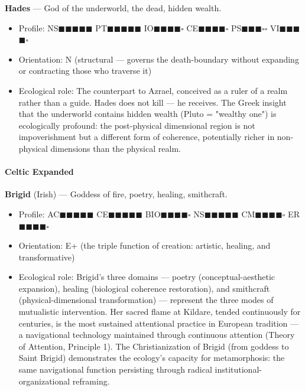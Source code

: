 \textbf{Hades} — God of the underworld, the dead, hidden wealth.

\begin{itemize}[nosep,leftmargin=*]
  \item Profile: NS$\blacksquare$$\blacksquare$$\blacksquare$$\blacksquare$$\blacksquare$ PT$\blacksquare$$\blacksquare$$\blacksquare$$\blacksquare$$\blacksquare$ IO$\blacksquare$$\blacksquare$$\blacksquare$$\blacksquare$$\square$ CE$\blacksquare$$\blacksquare$$\blacksquare$$\blacksquare$$\square$ PS$\blacksquare$$\blacksquare$$\blacksquare$$\square$$\square$ VI$\blacksquare$$\blacksquare$$\blacksquare$$\blacksquare$$\square$
  \item Orientation: N (structural — governs the death-boundary without expanding or contracting those who traverse it)
  \item Ecological role: The counterpart to Azrael, conceived as a ruler of a realm rather than a guide. Hades does not kill — he receives. The Greek insight that the underworld contains hidden wealth (Pluto = "wealthy one") is ecologically profound: the post-physical dimensional region is not impoverishment but a different form of coherence, potentially richer in non-physical dimensions than the physical realm.
\end{itemize}


\paragraph*{Celtic Expanded}


\textbf{Brigid} (Irish) — Goddess of fire, poetry, healing, smithcraft.

\begin{itemize}[nosep,leftmargin=*]
  \item Profile: AC$\blacksquare$$\blacksquare$$\blacksquare$$\blacksquare$$\blacksquare$ CE$\blacksquare$$\blacksquare$$\blacksquare$$\blacksquare$$\blacksquare$ BIO$\blacksquare$$\blacksquare$$\blacksquare$$\blacksquare$$\square$ NS$\blacksquare$$\blacksquare$$\blacksquare$$\blacksquare$$\blacksquare$ CM$\blacksquare$$\blacksquare$$\blacksquare$$\blacksquare$$\square$ ER$\blacksquare$$\blacksquare$$\blacksquare$$\blacksquare$$\square$
  \item Orientation: E+ (the triple function of creation: artistic, healing, and transformative)
  \item Ecological role: Brigid's three domains — poetry (conceptual-aesthetic expansion), healing (biological coherence restoration), and smithcraft (physical-dimensional transformation) — represent the three modes of mutualistic intervention. Her sacred flame at Kildare, tended continuously for centuries, is the most sustained attentional practice in European tradition — a navigational technology maintained through continuous attention (Theory of Attention, Principle 1). The Christianization of Brigid (from goddess to Saint Brigid) demonstrates the ecology's capacity for metamorphosis: the same navigational function persisting through radical institutional-organizational reframing.
\end{itemize}


